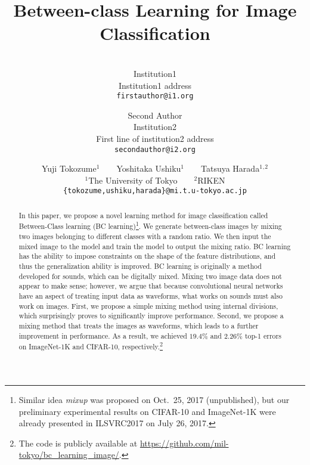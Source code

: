 \documentclass[10pt,twocolumn,letterpaper]{article}
\begin{document}
\title{Between-class Learning for Image Classification}

\author{\\
Institution1\\
Institution1 address\\
{\tt\small firstauthor@i1.org}
\and
Second Author\\
Institution2\\
First line of institution2 address\\
{\tt\small secondauthor@i2.org}
}

\author{Yuji Tokozume$^1$\,\,\,\,\,\,\,\,\,\,\,\,Yoshitaka Ushiku$^1$\,\,\,\,\,\,\,\,\,\,\,\,Tatsuya Harada$^1$$^,$$^2$\\
$^1$The University of Tokyo\,\,\,\,\,\,\,\,\,\,\,\,$^2$RIKEN\\
{\tt\small \{tokozume,ushiku,harada\}@mi.t.u-tokyo.ac.jp}\\
}

\maketitle
\thispagestyle{empty}

\begin{abstract}
In this paper, we propose a novel learning method for image classification called Between-Class learning (BC learning)\footnote{Similar idea {\it mixup} \cite{zhang2017mixup} was proposed on Oct.~25, 2017 (unpublished), but our preliminary experimental results on CIFAR-10 and ImageNet-1K were already presented in ILSVRC2017 on July 26, 2017.}. 
We generate between-class images by mixing two images belonging to different classes with a random ratio. We then input the mixed image to the model and train the model to output the mixing ratio.
BC learning has the ability to impose constraints on the shape of the feature distributions, and thus the generalization ability is improved.
BC learning is originally a method developed for sounds, which can be digitally mixed.
Mixing two image data does not appear to make sense; however, we argue that because convolutional neural networks have an aspect of treating input data as waveforms, what works on sounds must also work on images.
First, we propose a simple mixing method using internal divisions, which surprisingly proves to significantly improve performance. Second, we propose a mixing method that treats the images as waveforms, which leads to a further improvement in performance. As a result, we achieved $19.4\%$ and $2.26\%$ top-1 errors on ImageNet-1K and CIFAR-10, respectively.\footnote{The code is publicly available at \newline \url{https://github.com/mil-tokyo/bc_learning_image/}.}
\end{abstract}
\end{document}
